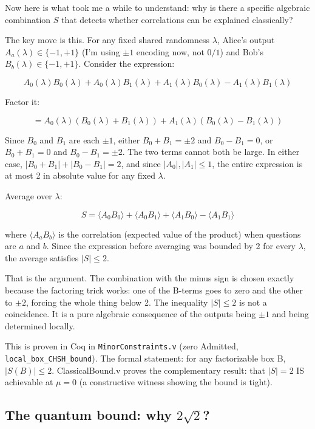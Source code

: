 \documentclass[11pt,a4paper]{article}
\theoremstyle{plain}
\theoremstyle{definition}
\theoremstyle{remark}
\begin{document}
Now here is what took me a while to understand: why is there a specific algebraic combination $S$ that detects whether correlations can be explained classically?

The key move is this. For any fixed shared randomness $\lambda$, Alice's output $A_a(\lambda) \in \{-1, +1\}$ (I'm using $\pm 1$ encoding now, not $0/1$) and Bob's $B_b(\lambda) \in \{-1, +1\}$. Consider the expression:

\[
A_0(\lambda) B_0(\lambda) + A_0(\lambda) B_1(\lambda) + A_1(\lambda) B_0(\lambda) - A_1(\lambda) B_1(\lambda)
\]

Factor it:

\[
= A_0(\lambda)(B_0(\lambda) + B_1(\lambda)) + A_1(\lambda)(B_0(\lambda) - B_1(\lambda))
\]

Since $B_0$ and $B_1$ are each $\pm 1$, either $B_0 + B_1 = \pm 2$ and $B_0 - B_1 = 0$, or $B_0 + B_1 = 0$ and $B_0 - B_1 = \pm 2$. The two terms cannot both be large. In either case, $|B_0 + B_1| + |B_0 - B_1| = 2$, and since $|A_0|, |A_1| \leq 1$, the entire expression is at most 2 in absolute value for any fixed $\lambda$.

Average over $\lambda$:

\[
S = \langle A_0 B_0 \rangle + \langle A_0 B_1 \rangle + \langle A_1 B_0 \rangle - \langle A_1 B_1 \rangle
\]

where $\langle A_a B_b \rangle$ is the correlation (expected value of the product) when questions are $a$ and $b$. Since the expression before averaging was bounded by 2 for every $\lambda$, the average satisfies $|S| \leq 2$.

That is the argument. The combination with the minus sign is chosen exactly because the factoring trick works: one of the B-terms goes to zero and the other to $\pm 2$, forcing the whole thing below 2. The inequality $|S| \leq 2$ is not a coincidence. It is a pure algebraic consequence of the outputs being $\pm 1$ and being determined locally.

This is proven in Coq in \texttt{MinorConstraints.v} (zero Admitted, \texttt{local\_box\_CHSH\_bound}). The formal statement: for any factorizable box B, $|S(B)| \leq 2$. ClassicalBound.v proves the complementary result: that $|S| = 2$ IS achievable at $\mu = 0$ (a constructive witness showing the bound is tight).

\subsection{\texorpdfstring{The quantum bound: why $2\sqrt{2}$?}{The quantum bound: why 2 sqrt 2?}}
\end{document}
